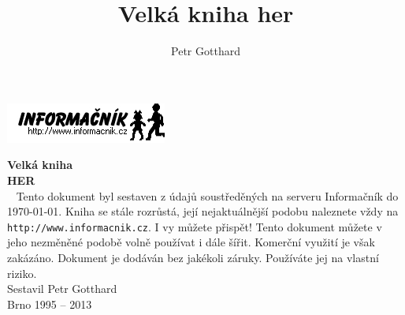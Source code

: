\documentclass[A4paper,10pt,openany,oneside]{book}
\author{Petr Gotthard}
\title{Velká kniha her}
\begin{document}
\pagestyle{empty}%

{\raggedleft
\includegraphics{inflogo}\\[3 cm]
}

{\centering
{
 \fontsize{2 cm}{2.4 cm}%
 \bfseries%
 Velká kniha
}\\[5mm]
{
 \fontsize{5.5 cm}{6.6 cm}%
 \bfseries%
 HER
}\\[8.5cm]
}
\cleardoublepage %
\pagestyle{fancy} %
~
\vfill
Tento dokument byl sestaven z údajů soustředěných na serveru
Informačník do \today. Kniha se stále rozrůstá, její nejaktuálnější
podobu naleznete vždy na
{\tt http://www.informacnik.cz}.
I vy můžete přispět!
Tento dokument můžete v jeho nezměněné podobě volně používat i dále šířit. 
Komerční využití je však zakázáno.
Dokument je dodáván bez jakékoli záruky. Používáte jej na vlastní
riziko.\\[1 cm]

{\centering
Sestavil Petr Gotthard\\
Brno 1995 -- 2013\\
}

\cleardoublepage

\renewcommand\multicolumntoc{2}
\tableofcontents
\cleardoublepage

\renewcommand\Large{\fontfamily{phv}\fontsize{10}{12}\selectfont}
\renewcommand\large{\fontfamily{phv}\fontsize{7}{8.4}\selectfont}


\newcommand{\nadpis}[2]{%
 \vskip 3ex%
 \addtocounter{#2}{1}%
 \noindent%
 {
  \fontfamily{phv}%
  \fontsize{7}{8.4}%
  \bfseries%
  \arabic{#2}.%
  \hspace{1.5mm}#1%
 }%
 \nopagebreak%
 \vskip 1ex%
}

\newenvironment{intabular}[1]{%
 \noindent%
 \begin{tabular}{#1}%
}{%
 \end{tabular}%
}

\newenvironment{intabularx}[1]{%
 \noindent%
 \tabularx{\columnwidth}{#1}%
}{%
 \endtabularx%
}

\newcommand{\napsal}[1]{%
 \noindent%
 {\em Napsal #1.}%
}
\end{document}
